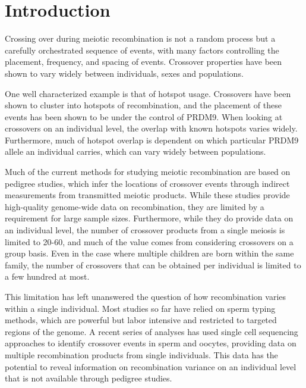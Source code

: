 

\section{Introduction}

Crossing over during meiotic recombination is not a random process but a carefully orchestrated sequence of events, with many factors controlling the placement, frequency, and spacing of events.
Crossover properties have been shown to vary widely between individuals, sexes and populations.

One well characterized example is that of hotspot usage.
Crossovers have been shown to cluster into hotspots of recombination\cite{Myers2005,hapmap2007}, and the placement of these events has been shown to be under the control of PRDM9\cite{Baudat2010,Myers2010,Parvanov2010}.
When looking at crossovers on an individual level, the overlap with known hotspots varies widely\cite{Coop2008}.
Furthermore, much of hotspot overlap is dependent on which particular PRDM9 allele an individual carries, which can vary widely between populations\cite{Baudat2010,Hinch2011}.

Much of the current methods for studying meiotic recombination are based on pedigree studies, which infer the locations of crossover events through indirect measurements from transmitted meiotic products.
While these studies provide high-quality genome-wide data on recombination, they are limited by a requirement for large sample sizes.
Furthermore, while they do provide data on an individual level, the number of crossover products from a single meiosis is limited to 20-60\cite{Lynn2004,Coop2008}, and much of the value comes from considering crossovers on a group basis.
Even in the case where multiple children are born within the same family, the number of crossovers that can be obtained per individual is limited to a few hundred at most.

This limitation has left unanswered the question of how recombination varies within a single individual.
Most studies so far have relied on sperm typing methods, which are powerful but labor intensive and restricted to targeted regions of the genome\cite{Jeffreys2004}.
A recent series of analyses has used single cell sequencing approaches to identify crossover events in sperm\cite{Wang2012,Lu2012} and oocytes\cite{Hou2013}, providing data on multiple recombination products from single individuals.
This data has the potential to reveal information on recombination variance on an individual level that is not available through pedigree studies.

